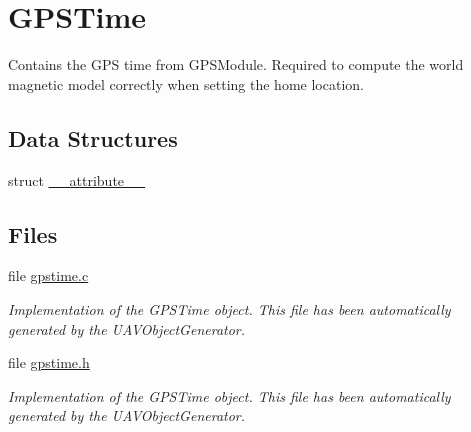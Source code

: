 \hypertarget{group___g_p_s_time}{\section{\-G\-P\-S\-Time}
\label{group___g_p_s_time}
}


\-Contains the \-G\-P\-S time from \-G\-P\-S\-Module. \-Required to compute the world magnetic model correctly when setting the home location.  


\subsection*{\-Data \-Structures}
\begin{DoxyCompactItemize}
\item 
struct \hyperlink{struct____attribute____}{\-\_\-\-\_\-attribute\-\_\-\-\_\-}
\end{DoxyCompactItemize}
\subsection*{\-Files}
\begin{DoxyCompactItemize}
\item 
file \hyperlink{gpstime_8c}{gpstime.\-c}
\begin{DoxyCompactList}\small\item\em \-Implementation of the \-G\-P\-S\-Time object. \-This file has been automatically generated by the \-U\-A\-V\-Object\-Generator. \end{DoxyCompactList}\item 
file \hyperlink{gpstime_8h}{gpstime.\-h}
\begin{DoxyCompactList}\small\item\em \-Implementation of the \-G\-P\-S\-Time object. \-This file has been automatically generated by the \-U\-A\-V\-Object\-Generator. \end{DoxyCompactList}\end{DoxyCompactItemize}
